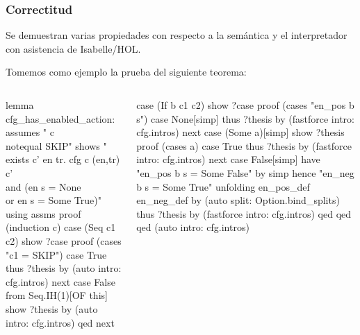 \begin{frame}[fragile]
\frametitle{Correctitud}
\Fontvi

Se demuestran varias propiedades con respecto a la semántica y el interpretador con asistencia de Isabelle/HOL.

Tomemos como ejemplo la prueba del siguiente teorema:



\begin{columns}[t]
\begin{semiverbatim}
lemma cfg_has_enabled_action:
  assumes " c \\notequal SKIP"
  shows "\\exists c' en tr. cfg c (en,tr) c'
    \\and (en s = None \\or en s = Some True)" 
  using assms
proof (induction c)
  case (Seq c1 c2)
  show ?case
  proof (cases "c1 = SKIP")
    case True
    thus ?thesis by (auto intro: cfg.intros)
  next
    case False
    from Seq.IH(1)[OF this]
      show ?thesis by (auto intro: cfg.intros)
  qed
next
\end{semiverbatim}
\begin{semiverbatim}
  case (If b c1 c2)
  show ?case
  proof (cases "en_pos b s")
    case None[simp]
    thus ?thesis
      by (fastforce intro: cfg.intros)
  next
    case (Some a)[simp]
      show ?thesis
      proof (cases a)
        case True
        thus ?thesis
          by (fastforce intro: cfg.intros)
      next
        case False[simp]
        have "en_pos b s = Some False" by simp
        hence "en_neg b s = Some True"
          unfolding en_pos_def en_neg_def
          by (auto split: Option.bind_splits)
        thus ?thesis
          by (fastforce intro: cfg.intros)
      qed
  qed
qed (auto intro: cfg.intros)
\end{semiverbatim}

\end{columns}


\end{frame}

